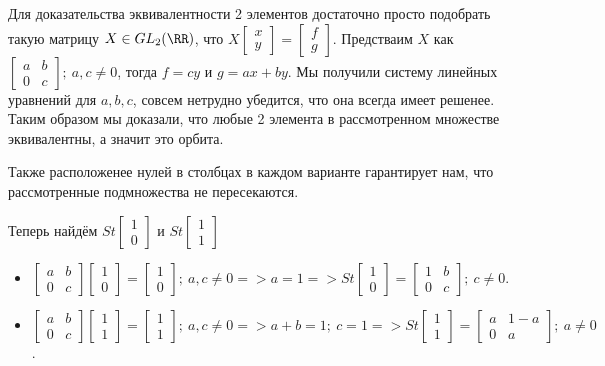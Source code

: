 \begin{enumerate}
    Для доказательства эквивалентности 2 элементов достаточно просто подобрать такую матрицу $X \in GL_2(\RR)$, что $X\begin{bmatrix}x\\y\end{bmatrix} = \begin{bmatrix}f\\g\end{bmatrix}$. Предстваим $X$ как $\begin{bmatrix} a&b\\0&c \end{bmatrix};\ a,c \ne 0$, тогда $f = cy$ и $g = ax+by$. Мы получили систему линейных уравнений для $a, b, c$, совсем нетрудно убедится, что она всегда имеет решенее. Таким образом мы доказали, что любые 2 элемента в рассмотренном множестве эквивалентны, а значит это орбита.
\end{enumerate}
Также расположенее нулей в столбцах в каждом варианте гарантирует нам, что рассмотренные подмножества не пересекаются.
\par Теперь найдём $St\begin{bmatrix}1\\0\end{bmatrix}$ и $St\begin{bmatrix}1\\1\end{bmatrix}$
\begin{itemize}
    \item $\begin{bmatrix} a & b\\ 0&c \end{bmatrix}\begin{bmatrix}1\\0\end{bmatrix} = \begin{bmatrix}1\\0\end{bmatrix};\ a,c \ne 0 => a = 1 => St\begin{bmatrix}1\\0\end{bmatrix} = \begin{bmatrix}1&b\\0&c\end{bmatrix};\ c\ne 0$.
    \item $\begin{bmatrix} a & b\\ 0&c \end{bmatrix}\begin{bmatrix}1\\1\end{bmatrix} = \begin{bmatrix}1\\1\end{bmatrix};\ a,c \ne 0 => a+b = 1;\ c = 1 => St\begin{bmatrix}1\\1\end{bmatrix} = \begin{bmatrix}a&1-a\\0&a\end{bmatrix};\ a \ne 0$.
\end{itemize}


